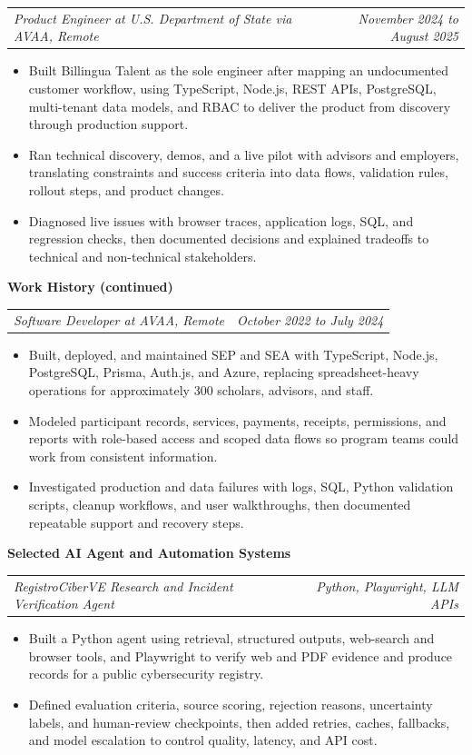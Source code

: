 \documentclass[10pt,letterpaper]{article}
\makeatletter
\newcommand{\bodyfont}{\fontsize{10.5}{15.75}\selectfont}
\newcommand{\sectiontitle}[1]{%
  \vspace{4pt}
  {\bodyfont\textbf{#1}}\par
  \nopagebreak[4]
  \vspace{2pt}
}
\newcommand{\roleline}[2]{%
  \begin{tabularx}{\textwidth}{@{}Xr@{}}
    \bodyfont\textit{#1} & \bodyfont\textit{#2}
  \end{tabularx}
  \nopagebreak[4]
  \vspace{1pt}
}
\makeatother
\begin{document}
\vspace{3pt}
\roleline{Product Engineer at U.S. Department of State via AVAA, Remote}{November 2024 to August 2025}
\begin{itemize}
  \item Built Billingua Talent as the sole engineer after mapping an undocumented customer workflow, using TypeScript, Node.js, REST APIs, PostgreSQL, multi-tenant data models, and RBAC to deliver the product from discovery through production support.
  \item Ran technical discovery, demos, and a live pilot with advisors and employers, translating constraints and success criteria into data flows, validation rules, rollout steps, and product changes.
  \item Diagnosed live issues with browser traces, application logs, SQL, and regression checks, then documented decisions and explained tradeoffs to technical and non-technical stakeholders.
\end{itemize}

\newpage
\sectiontitle{Work History (continued)}

\roleline{Software Developer at AVAA, Remote}{October 2022 to July 2024}
\begin{itemize}
  \item Built, deployed, and maintained SEP and SEA with TypeScript, Node.js, PostgreSQL, Prisma, Auth.js, and Azure, replacing spreadsheet-heavy operations for approximately 300 scholars, advisors, and staff.
  \item Modeled participant records, services, payments, receipts, permissions, and reports with role-based access and scoped data flows so program teams could work from consistent information.
  \item Investigated production and data failures with logs, SQL, Python validation scripts, cleanup workflows, and user walkthroughs, then documented repeatable support and recovery steps.
\end{itemize}

\sectiontitle{Selected AI Agent and Automation Systems}

\roleline{RegistroCiberVE Research and Incident Verification Agent}{Python, Playwright, LLM APIs}
\begin{itemize}
  \item Built a Python agent using retrieval, structured outputs, web-search and browser tools, and Playwright to verify web and PDF evidence and produce records for a public cybersecurity registry.
  \item Defined evaluation criteria, source scoring, rejection reasons, uncertainty labels, and human-review checkpoints, then added retries, caches, fallbacks, and model escalation to control quality, latency, and API cost.
\end{itemize}
\end{document}
